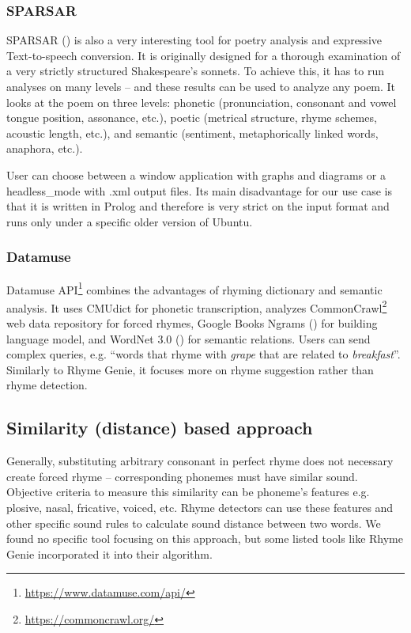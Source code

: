 \subsubsection*{SPARSAR}
SPARSAR (\cite{Delmonte2014}) is also a very interesting tool for poetry analysis and expressive Text-to-speech conversion. It is originally designed for a thorough examination of a very strictly structured Shakespeare's sonnets. To achieve this, it has to run analyses on many levels -- and these results can be used to analyze any poem. It looks at the poem on three levels: phonetic (pronunciation, consonant and vowel tongue position, assonance, etc.), poetic (metrical structure, rhyme schemes, acoustic length, etc.), and semantic (sentiment, metaphorically linked words, anaphora, etc.).

User can choose between a window application with graphs and diagrams or a \gls{headless_mode} with .xml output files. Its main disadvantage for our use case is that it is written in Prolog and therefore is very strict on the input format and runs only under a specific older version of Ubuntu. 

\subsubsection*{Datamuse}
Datamuse API\footnote{\url{https://www.datamuse.com/api/}} combines the advantages of  rhyming dictionary and semantic analysis. It uses CMUdict for phonetic transcription, analyzes CommonCrawl\footnote{\url{https://commoncrawl.org/}} web data repository for forced rhymes, Google Books Ngrams (\cite{weiss2015google}) for building language model, and WordNet 3.0 (\cite{pearson2005encyclopedia}) for semantic relations. Users can send complex queries, e.g. ``words that rhyme with \textit{grape} that are related to \textit{breakfast}''. Similarly to Rhyme Genie, it focuses more on rhyme suggestion rather than rhyme detection.


\subsection{Similarity (distance) based approach}
Generally, substituting arbitrary consonant in perfect rhyme does not necessary create forced rhyme -- corresponding phonemes must have similar sound. Objective criteria to measure this similarity can be phoneme's features e.g. plosive, nasal, fricative, voiced, etc. Rhyme detectors can use these features and other specific sound rules to calculate sound distance between two words. We found no specific tool focusing on this approach, but some listed tools like Rhyme Genie incorporated it into their algorithm. 

